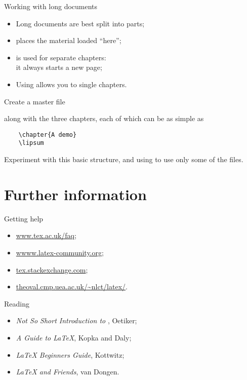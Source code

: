 \begin{frame}{Working with long documents}

  \begin{itemize}
    \item Long documents are best split into parts;
    \item {} places the material loaded \enquote{here};
    \item {} is used for separate chapters:\\ it always starts
      a new page;
    \item Using  allows you to  single chapters.
  \end{itemize}
  
\end{frame}

\begin{exercise}

  Create a master file
  
  along with the three chapters, each of which can be as simple as
  \begin{verbatim}
    \chapter{A demo}
    \lipsum
  \end{verbatim}
  Experiment with this basic structure, and using  to
  use only some of the files.

\end{exercise}


\section{Further information}

\begin{frame}{Getting help}

  \begin{itemize}
    \item \url{www.tex.ac.uk/faq};
    \item \url{wwww.latex-community.org};
    \item \url{tex.stackexchange.com};
    \item \url{theoval.cmp.uea.ac.uk/~nlct/latex/}.
  \end{itemize}

\end{frame}

\begin{frame}{Reading}

  \begin{itemize}
    \item \emph{Not So Short Introduction to \LaTeXe}, Oetiker;
    \item \emph{A Guide to \LaTeX}, Kopka and Daly;
    \item \emph{\LaTeX{} Beginners Guide}, Kottwitz;
    \item \emph{\LaTeX{} and Friends}, van Dongen.
  \end{itemize}

\end{frame}



